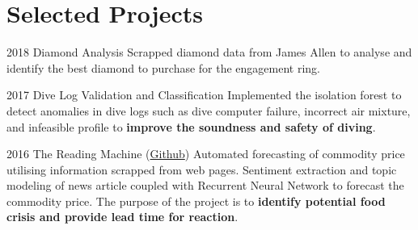 \documentclass{tccv}
\begin{document}
\section{Selected Projects}
\begin{yearlist}

\item{2018} {Diamond Analysis} {Scrapped diamond data from James Allen
  to analyse and identify the best diamond to purchase for the
  engagement ring.}
  
  
\item{2017} {Dive Log Validation and Classification} {Implemented the
  isolation forest to detect anomalies in dive logs such as dive
  computer failure, incorrect air mixture, and infeasible profile to
  \textbf{improve the soundness and safety of diving}.}

\item{2016} {The Reading Machine
  (\href{https://github.com/EST-Team-Adam/TheReadingMachine}{Github})}
  {Automated forecasting of commodity price utilising information
    scrapped from web pages. Sentiment extraction and topic modeling
    of news article coupled with Recurrent Neural Network to forecast
    the commodity price. The purpose of the project is to
    \textbf{identify potential food crisis and provide lead time for
      reaction}.}
  
  



\end{yearlist}
\end{document}

